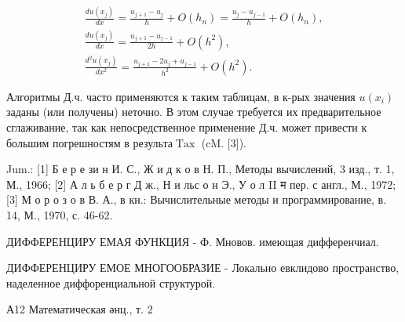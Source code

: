\documentclass[10pt]{article}
\begin{document}
\[

\begin{gathered}

\frac{d u\left(x_{j}\right)}{d x}=\frac{u_{j+1}-u_{j}}{h}+O\left(h_{n}\right)=\frac{u_{j}-u_{j-1}}{h}+O\left(h_{n}\right), \\

\frac{d u\left(x_{j}\right)}{d x}=\frac{u_{j+1}-u_{j-1}}{2 h}+O\left(h^{2}\right), \\

\frac{d^{2} u\left(x_{j}\right)}{d x^{2}}=\frac{u_{j+1}-2 u_{j}+u_{j-1}}{h^{2}}+O\left(h^{2}\right) .

\end{gathered}

\]



Алгоритмы Д.ч. часто применяются к таким таблицам, в к-рых значения $u\left(x_{i}\right)$ заданы (или получены) неточно. В этом случае требуется их предварительное сглаживание, так как непосредственное применение Д.ч. может привести к большим погрешностям в результа$\operatorname{Tax}$ (cM. [3]).



Jum.: [1] Б е р е зи н И. С., Ж и д к о в Н. П., Методы вычислений, 3 изд., т. 1, М., 1966; [2] А л ь б е р г Д ж., Н и льс о н Э., У о л II म пер. с англ., М., 1972; [3] М о р о з о в В. А., в кн.: Вычислительные методы и программирование, в. 14, М., 1970, с. 46-62.



ДИФФЕРЕНЦИРУ ЕМАЯ ФУНКЦИЯ - Ф. Мновов. имеющая дифференчиал.



ДИФФЕРЕНЦИРУ ЕМОЕ МНОГООБРАЗИЕ - Локально евклидово пространство, наделенное диффоренциальной структурой.



А12 Математическая әнц., т. 2
\end{document}
